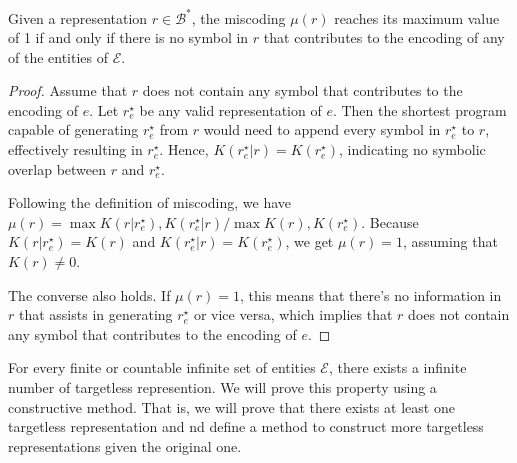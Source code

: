 \begin{proposition}
\label{prop:miscoding_upper_bound}
Given a representation $r \in \mathcal{B}^\ast$, the miscoding $\mu(r)$ reaches its maximum value of 1 if and only if there is no symbol in $r$ that contributes to the encoding of any of the entities of $\mathcal{E}$.
\end{proposition}
\begin{proof}
Assume that $r$ does not contain any symbol that contributes to the encoding of $e$. Let $r^\star_e$ be any valid representation of $e$. Then the shortest program capable of generating $r^\star_e$ from $r$ would need to append every symbol in $r^\star_e$ to $r$, effectively resulting in $r^\star_e$. Hence, $K(r^\star_e | r) = K(r^\star_e)$, indicating no symbolic overlap between $r$ and $r^\star_e$.

Following the definition of miscoding, we have $\mu(r) = \max{ K(r | r^\star_e), K(r^\star_e | r) } / \max{K(r), K(r^\star_e)}$. Because $K(r | r^\star_e) = K(r)$ and $K(r^\star_e | r) = K(r^\star_e)$, we get $\mu(r) = 1$, assuming that $K(r) \neq 0$.

The converse also holds. If $\mu(r) = 1$, this means that there's no information in $r$ that assists in generating $r^\star_e$ or vice versa, which implies that $r$ does not contain any symbol that contributes to the encoding of $e$.
\end{proof}

For every finite or countable infinite set of entities $\mathcal{E}$, there exists a infinite number of targetless represention. We will prove this property using a constructive method. That is, we will prove that there exists at least one targetless representation and nd define a method to construct more targetless representations given the original one.

